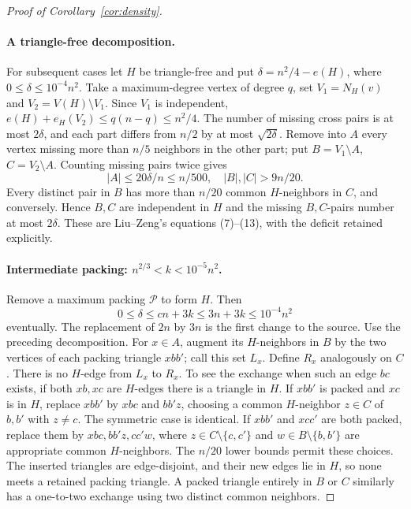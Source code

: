 \documentclass[11pt]{article}
\begin{document}
\begin{proof}[Proof of Corollary~\ref{cor:density}]
\paragraph{A triangle-free decomposition.}
For subsequent cases let $H$ be triangle-free and put
$\delta=n^2/4-e(H)$, where $0\le\delta\le10^{-4}n^2$.
Take a maximum-degree vertex of degree $q$, set $V_1=N_H(v)$ and
$V_2=V(H)\setminus V_1$. Since $V_1$ is independent,
$e(H)+e_H(V_2)\le q(n-q)\le n^2/4$. The number of missing cross
pairs is at most $2\delta$, and each part differs from $n/2$ by at
most $\sqrt{2\delta}$. Remove into $A$ every vertex missing more
than $n/5$ neighbors in the other part; put $B=V_1\setminus A$,
$C=V_2\setminus A$. Counting missing pairs twice gives
\begin{equation}\label{eq:decomposition}
|A|\le20\delta/n\le n/500,\quad |B|,|C|>9n/20.
\end{equation}
Every distinct pair in $B$ has more than $n/20$ common $H$-neighbors
in $C$, and conversely. Hence $B,C$ are independent in $H$ and the
missing $B,C$-pairs number at most $2\delta$. These are Liu--Zeng's
equations (7)--(13), with the deficit retained explicitly.

\paragraph{Intermediate packing: $n^{2/3}<k<10^{-5}n^2$.}
Remove a maximum packing $\mathcal P$ to form $H$. Then
\begin{equation}\label{eq:delta}
0\le\delta\le cn+3k\le3n+3k\le10^{-4}n^2
\end{equation}
eventually. The replacement of $2n$ by $3n$ is the first change to the
source. Use the preceding decomposition. For $x\in A$, augment its
$H$-neighbors in $B$ by the two vertices of each packing triangle
$xbb'$; call this set $L_x$. Define $R_x$ analogously on $C$.
There is no $H$-edge from $L_x$ to $R_x$. To see the exchange when
such an edge $bc$ exists, if both $xb,xc$ are $H$-edges there is a
triangle in $H$. If $xbb'$ is packed and $xc$ is in $H$, replace
$xbb'$ by $xbc$ and $bb'z$, choosing a common $H$-neighbor $z\in C$
of $b,b'$ with $z\ne c$. The symmetric case is identical. If
$xbb'$ and $xcc'$ are both packed, replace them by $xbc,bb'z,cc'w$,
where $z\in C\setminus\{c,c'\}$ and
$w\in B\setminus\{b,b'\}$ are appropriate common $H$-neighbors.
The $n/20$ lower bounds permit these choices. The inserted triangles
are edge-disjoint, and their new edges lie in $H$, so none meets a
retained packing triangle. A packed triangle entirely in $B$ or $C$
similarly has a one-to-two exchange using two distinct common neighbors.


\end{proof}
\end{document}
